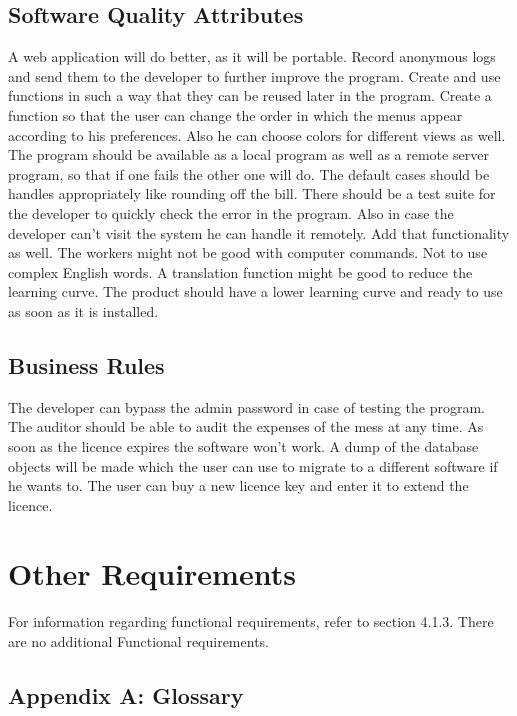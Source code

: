 \documentclass{scrreprt}
\begin{document}
\section{Software Quality Attributes}
A web application will do better, as it will be portable. Record anonymous logs and send them to the developer to further improve the program. Create and use functions in such a way that they can be reused later in the program. Create a function so that the user can change the order in which the menus appear according to his preferences. Also he can choose colors for different views as well. The program should be available as a local program as well as a remote server program, so that if one fails the other one will do. The default cases should be handles appropriately like rounding off the bill. There should be a test suite for the developer to quickly check the error in the program.
Also in case the developer can't visit the system he can handle it remotely. Add that functionality as well.
The workers might not be good with computer commands. Not to use complex English words. A translation function might be good to reduce the learning curve.
The product should have a lower learning curve and ready to use as soon as it is installed.

\section{Business Rules}
The developer can bypass the admin password in case of testing the program.
The auditor should be able to audit the expenses of the mess at any time.
As soon as the licence expires the software won't work. A dump of the database objects will be made which the user can use to migrate to a different software if he wants to. The user can buy a new licence key and enter it to extend the licence.


\chapter{Other Requirements}
For information regarding functional requirements, refer to section 4.1.3. There  are  no  additional  Functional 
requirements.

\section{Appendix A: Glossary}
\end{document}
